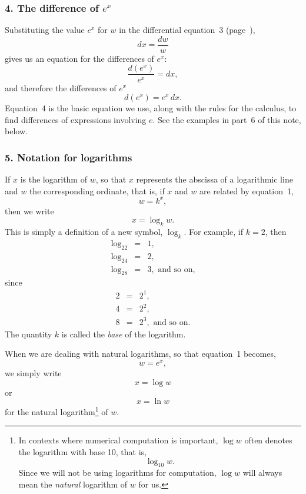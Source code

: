\documentclass[twoside,openright]{article}
\begin{document}
\subsubsection*{4. The difference  of $e^x$}

Substituting the value $e^x$ for $w$ in the differential equation~3 (page~\pageref{logdeq}),
\setcounter{equation}{2}
\begin{equation}
dx = \frac{dw}{w}
\end{equation}
 gives us an equation for the differences of $e^x$:
$$\frac{d(e^x)}{e^x}   =  dx,$$
and therefore the differences of $e^x$
\begin{equation}
d(e^x) =  e^x\,dx.\label{dex}
\end{equation}
Equation~4 is the basic equation we use, along with the rules for the
calculus, to find differences of expressions involving $e$.  See the
examples in part~6 of this note, below.



\subsubsection*{5. Notation for logarithms}

If $x$ is the logarithm of $w$, so that $x$ represents the abscissa of
a logarithmic line and $w$ the corresponding ordinate, that is, if $x$
and $w$ are related by equation~1,
$$w = k^x,$$
then we write 
$$x = \log_kw.$$
This is simply a definition of a new symbol, $\log_k$.  For example, if $k=2$, then
\begin{eqnarray*}
\log_22 & = & 1,\\
\log_24 & = & 2,\\
\log_28 & = & 3, \mbox{ and so on,}
\end{eqnarray*}
since 
\begin{eqnarray*}
2 & = & 2^1 ,\\
4 & = & 2^2,\\
8 & = & 2^3, \mbox{ and so on.}
\end{eqnarray*}
The quantity $k$ is called the {\em base} of the logarithm.

When we are dealing with natural logarithms, so that equation~1 becomes,
$$w = e^x,$$
we simply write
$$x = \log w$$\label{nlognotation}
or
$$x = \ln w$$
for the natural logarithm\footnote{In contexts where numerical
  computation is important, $\log w$ often denotes the logarithm with
  base 10, that is,
$$\log_{10} w.$$
Since we will not be using logarithms for computation, $\log w$ will
always mean the {\em natural} logarithm of $w$ for us.} of $w$.
\end{document}

